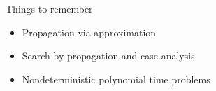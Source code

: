 \begin{frame}{Things to remember}
  \bigskip
  \begin{itemize}
  \item Propagation via approximation
  \item Search by propagation and case-analysis
  \item Nondeterministic polynomial time problems
  \end{itemize}
\end{frame}
%

